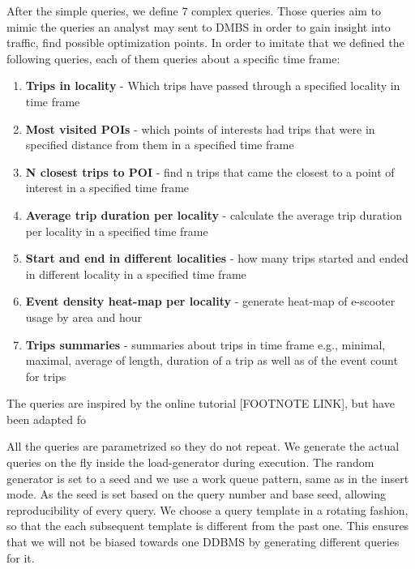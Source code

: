 After the simple queries, we define 7 complex queries.
Those queries aim to mimic the queries an analyst may sent to DMBS in order to gain insight into traffic, find possible optimization points.
In order to imitate that we defined the following queries, each of them queries about a specific time frame:
\begin{enumerate}
  \item \textbf{Trips in locality} - Which trips have passed through a specified locality in time frame
  \item \textbf{Most visited POIs} - which points of interests had trips that were in specified distance from them in a specified time frame
  \item \textbf{N closest trips to POI} - find n trips that came the closest to a point of interest in a specified time frame
  \item \textbf{Average trip duration per locality} - calculate the average trip duration per locality in a specified time frame
  \item \textbf{Start and end in different localities} - how many trips started and ended in different locality in a specified time frame
  \item \textbf{Event density heat-map per locality} - generate heat-map of e-scooter usage by area and hour
  \item \textbf{Trips summaries} - summaries about trips in time frame e.g., minimal, maximal, average of length, duration of a trip as well as of the event count for trips
\end{enumerate}

The queries are inspired by the online tutorial [FOOTNOTE LINK], but have been adapted fo

All the queries are parametrized so they do not repeat.
We generate the actual queries on the fly inside the load-generator during execution.
The random generator is set to a seed and we use a work queue pattern, same as in the insert mode.
As the seed is set based on the query number and base seed, allowing reproducibility of every query.
We choose a query template in a rotating fashion, so that the each subsequent template is different from the past one.
This ensures that we will not be biased towards one DDBMS by generating different queries for it.

